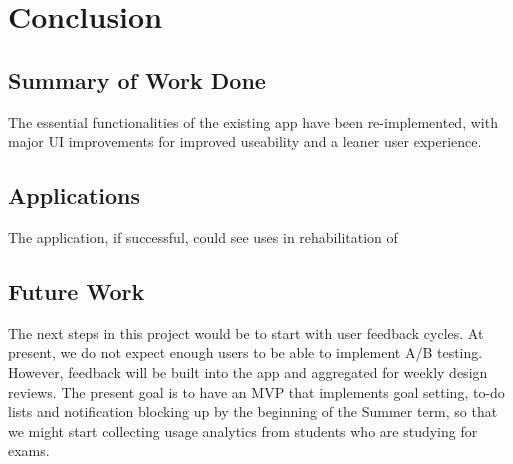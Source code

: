 \chapter{Conclusion}

\label{ch:conclusions}

\section{Summary of Work Done}
The essential functionalities of the existing app have been re-implemented, with major UI improvements for improved useability and a leaner user experience. 


\section{Applications}
The application, if successful, could see uses in rehabilitation of 

\section{Future Work}
The next steps in this project would be to start with user feedback cycles. At present, we do not expect enough users to be able to implement A/B testing. However, feedback will be built into the app and aggregated for weekly design reviews. The present goal is to have an MVP that implements goal setting, to-do lists and notification blocking up by the beginning of the Summer term, so that we might start collecting usage analytics from students who are studying for exams.